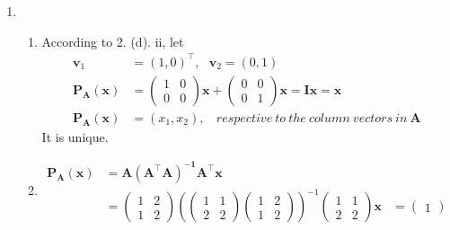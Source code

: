 \documentclass[11pt,letter,notitlepage]{article}
\newcommand{\proj}[2]{\textbf{P}_{#2} (#1)}
\begin{document}
\begin{solution}
\begin{enumerate}
\begin{enumerate}
			\end{enumerate}
			\item
			\begin{enumerate}
				\item
				According to 2. (d). ii, let
				\begin{align*}
					\mathbf{v}_1&=(1, 0)^\top,~~~\mathbf{v}_2=(0,1)\\
					\proj{\mathbf{x}}{\mathbf{A}}&=
					\begin{pmatrix}
						1&0\\
						0&0
					\end{pmatrix}\mathbf{x}
					+
					\begin{pmatrix}
						0&0\\
						0&1
					\end{pmatrix}\mathbf{x}
					=\mathbf{Ix}=\mathbf{x}\\
					\proj{\mathbf{x}}{\mathbf{A}}&=(x_1,x_2),~~~~respective~ to~ the~ column~ vectors~ in~ \mathbf{A}
				\end{align*}
				It is unique.
				\item
				\begin{align*}
					\proj{\mathbf{x}}{\mathbf{A}}
					&=\mathbf{A(A^{\top}A)^{-1}A^{\top}x}\\
					&=
					\begin{pmatrix}
					   1&2\\1&2
					\end{pmatrix}(
					\begin{pmatrix}
						1&1\\2&2
					\end{pmatrix}
					\begin{pmatrix}
					  1&2\\1&2
					\end{pmatrix})^{-1}
					\begin{pmatrix}
						1&1\\2&2
					\end{pmatrix}\mathbf{x}
					&=
					\begin{pmatrix}
						1
					\end{pmatrix}
				\end{align*}

			\end{enumerate}

	\end{enumerate}

\end{solution}
\newpage
\end{document}
